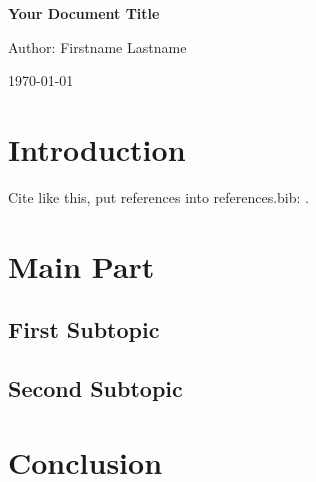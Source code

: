 \documentclass[11pt,a4paper]{article}
\begin{document}
\begin{center}
  \LARGE\textbf{Your Document Title}
  
  \large{Author: Firstname Lastname}
  
  \normalsize{\today}
\end{center}

\section{Introduction}
Cite like this, put references into references.bib: \parencite{reference2023}.

\section{Main Part}

\subsection{First Subtopic}

\subsection{Second Subtopic}

\section{Conclusion}

\printbibliography
\end{document}
